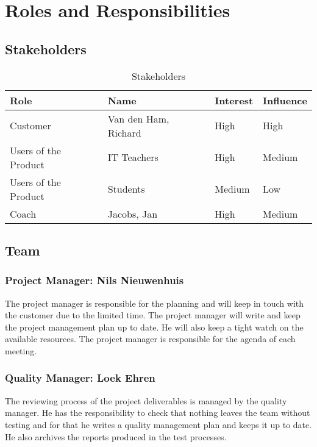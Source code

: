 \section{Roles and Responsibilities}

\subsection{Stakeholders}
\begin{table}[h]
    \begin{tabular}{l|l|l|l}
        \textbf{Role}               &   \textbf{Name}           &   \textbf{Interest}     &     \textbf{Influence}  \\ \hline \hline
        Customer                    &   Van den Ham, Richard    &   High                  &     High                \\ \hline
        Users of the Product        &   IT Teachers             &   High                  &     Medium              \\ \hline
        Users of the Product        &   Students                &   Medium                &     Low                 \\ \hline
        Coach                       &   Jacobs, Jan             &   High                  &     Medium              \\ \hline        
    \end{tabular}
    \caption{Stakeholders}
\end{table}

\subsection{Team}
    \subsubsection{Project Manager: Nils Nieuwenhuis}
    The project manager is responsible for the planning
    and will keep in touch with the customer due to the limited time. The project manager will write and
    keep the project management plan up to date. He will also keep a tight watch on the available
    resources. The project manager is responsible for the agenda of each meeting.

    \subsubsection{Quality Manager: Loek Ehren}
    The reviewing process of the project deliverables is managed by the quality manager. He has the responsibility to check that nothing leaves
    the team without testing and for that he writes a quality management plan and keeps it up to date. He also archives the reports produced
    in the test processes. 

